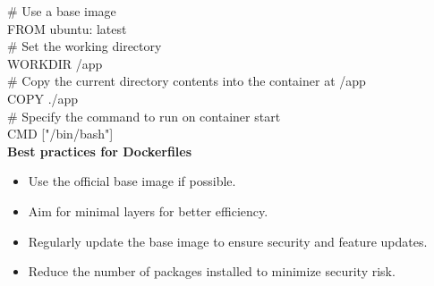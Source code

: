 \documentclass{article}
\begin{document}
$\#$  Use a base image \\
FROM ubuntu: latest \\

$\#$ Set the working directory \\
WORKDIR /app \\

$\#$ Copy the current directory contents into the container at /app \\
COPY ./app \\

$\#$ Specify the command to run on container start \\
CMD ["/bin/bash"]  \\



\textbf{Best practices for Dockerfiles} \\
\begin{itemize}
\color{blue}
\item Use the official base image if possible.
\item Aim for minimal layers for better efficiency.
\item Regularly update the base image to ensure security and feature updates.
\item Reduce the number of packages installed to minimize security risk.
\end{itemize}
\end{document}

